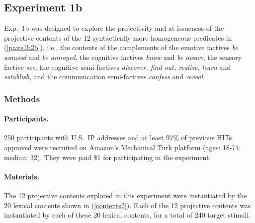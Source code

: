 \documentclass[11pt,fleqn]{article}
\newcommand{\6}{\mbox{$[\hspace*{-.6mm}[$}}
\newcommand{\9}{\mbox{$]\hspace*{-.6mm}]$}}
\begin{document}
\subsection{Experiment 1b}\label{s-exp1b} 

Exp.~1b was designed to explore the projectivity and at-issueness of the projective contents of the 12 syntactically more homogeneous predicates in (\ref{pairs1b2b}), i.e., the contents of the complements of the emotive factives {\em be amused} and {\em be annoyed}, the cognitive factives {\em know} and {\em be aware}, the sensory factive {\em see}, the cognitive semi-factives {\em discover, find out, realize, learn} and {\em establish}, and the communication semi-factives {\em confess} and {\em reveal}.


\subsubsection{Methods}

\paragraph{Participants.} 250 participants with U.S.\ IP addresses and at least 97\% of previous HITs approved were recruited on Amazon's Mechanical Turk platform (ages: 18-74; median: 32). They were paid \$1 for participating in the experiment.

\paragraph{Materials.} The 12 projective contents explored in this experiment were instantiated by the 20 lexical contents shown in (\ref{contents2}). Each of the 12 projective contents was instantiated by each of these 20 lexical contents, for a total of 240 target stimuli. 
\end{document}
